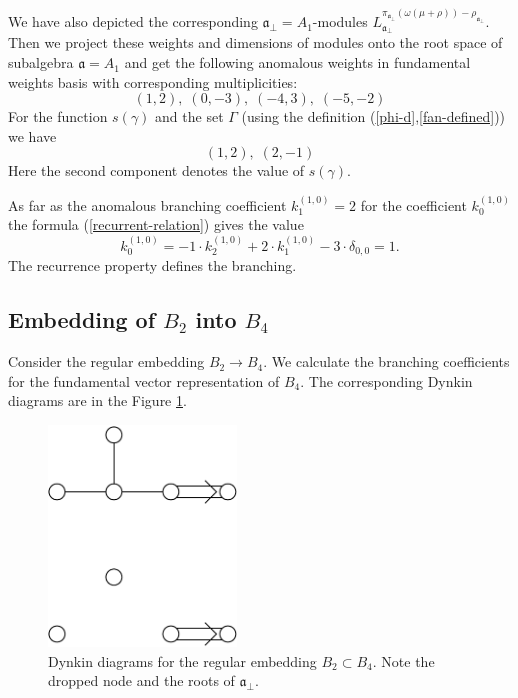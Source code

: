 \documentclass[a4paper,12pt]{article}
\theoremstyle{definition} \newtheorem{Def}{Definition}
\begin{document}
We have also depicted the corresponding $\mathfrak{a}_{\bot}=A_1$-modules $L^{\pi_{\mathfrak{a}_{\bot}}(\omega(\mu+\rho))-\rho_{\mathfrak{a}_{\bot}}}_{\mathfrak{a}_{\bot}}$.
Then we project these weights and dimensions of modules onto the root space of subalgebra $\mathfrak{a}=A_1$ and get the following anomalous weights in fundamental weights basis with corresponding multiplicities:
\begin{equation}
  \label{eq:25}
  (1,2),\; (0,-3),\; (-4,3),\; (-5,-2)
\end{equation}
For the function $s(\gamma)$ and the set $\Gamma$ (using the definition (\ref{phi-d},\ref{fan-defined})) we have
\begin{equation}
  \label{eq:22}
  (1,2),\; (2,-1)
\end{equation}
Here the second component denotes the value of $s(\gamma)$.

As far as the anomalous branching coefficient $k^{(1,0)}_{1}=2$ for the coefficient $k^{(1,0)}_{0}$ the formula (\ref{recurrent-relation}) gives the value
\begin{equation}
  \label{eq:23}
  k^{(1,0)}_{0}=-1\cdot k^{(1,0)}_2 +2\cdot k^{(1,0)}_1 - 3\cdot \delta_{0,0} = 1.
\end{equation}
The recurrence property defines the branching.

\subsection{Embedding of $B_2$ into $B_4$}
\label{sec:someth-high-dimens}
Consider the regular embedding $B_2 \longrightarrow B_4$.
We calculate the branching coefficients for the fundamental vector representation of $B_4$.
The corresponding Dynkin diagrams are in the Figure \ref{fig:dynkin}.
\begin{figure}[h]
  \centering
  \includegraphics[width=50mm]{B4_B2_2A1.pdf}
  \caption{Dynkin diagrams for the regular embedding $B_2\subset B_4$. Note the dropped node and the roots of $\mathfrak{a}_{\bot}$. }
  \label{fig:dynkin}
\end{figure}
\end{document}
